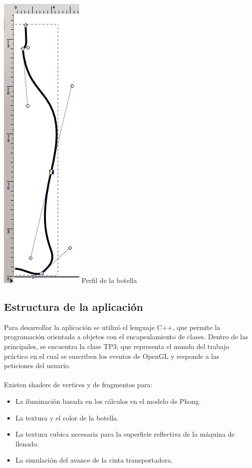 \documentclass[11pt]{article}
\begin{document}
 \includegraphics[scale=0.5]{perfil} Perfil de la botella

\subsection{Estructura de la aplicaci\'on}
Para desarrollar la aplicaci\'on se utiliz\'o el lenguaje C++, que permite la programaci\'on orientada a objetos con el encapsulamiento de clases. 
Dentro de las principales, se encuentra la clase TP3; que representa el mundo del trabajo pr\'actico en el cual se suscriben los eventos de OpenGL y responde a las peticiones del usuario. \\\\
Existen shaders de vertices y de fragmentos para:
\begin{itemize} 
 \item La iluminaci\'on basada en los c\'alculos en el modelo de Phong.
 \item La textura y el color de la botella.
 \item La textura cubica necesaria para la superficie reflectiva de la máquina de llenado.
 \item La simulación del avance de la cinta transportadora.
\end{itemize}
\newpage
\end{document}
